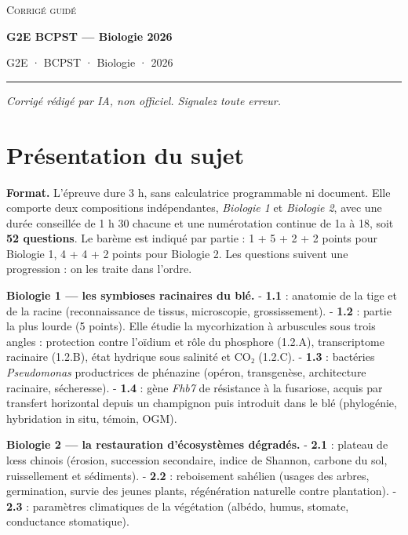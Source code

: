 \documentclass[11pt,a4paper]{article}
\begin{document}
\thispagestyle{plain}
\begin{center}
  {\small\scshape Corrigé guidé}\par\smallskip
  {\LARGE\bfseries G2E BCPST — Biologie 2026\par}\medskip
  {\large G2E · BCPST · Biologie · 2026\par}
\end{center}
\vspace{2pt}\hrule\vspace{8pt}

\emph{Corrigé rédigé par IA, non officiel. Signalez toute erreur.}

\hypertarget{pruxe9sentation-du-sujet}{%
\section{Présentation du sujet}\label{pruxe9sentation-du-sujet}}

\textbf{Format.} L'épreuve dure 3 h, sans calculatrice programmable ni document. Elle comporte deux compositions indépendantes, \emph{Biologie 1} et \emph{Biologie 2}, avec une durée conseillée de 1 h 30 chacune et une numérotation continue de 1a à 18, soit \textbf{52 questions}. Le barème est indiqué par partie : 1 + 5 + 2 + 2 points pour Biologie 1, 4 + 4 + 2 points pour Biologie 2. Les questions suivent une progression : on les traite dans l'ordre.

\textbf{Biologie 1 --- les symbioses racinaires du blé.}
- \textbf{1.1} : anatomie de la tige et de la racine (reconnaissance de tissus, microscopie, grossissement).
- \textbf{1.2} : partie la plus lourde (5 points). Elle étudie la mycorhization à arbuscules sous trois angles : protection contre l'oïdium et rôle du phosphore (1.2.A), transcriptome racinaire (1.2.B), état hydrique sous salinité et CO₂ (1.2.C).
- \textbf{1.3} : bactéries \emph{Pseudomonas} productrices de phénazine (opéron, transgenèse, architecture racinaire, sécheresse).
- \textbf{1.4} : gène \emph{Fhb7} de résistance à la fusariose, acquis par transfert horizontal depuis un champignon puis introduit dans le blé (phylogénie, hybridation in situ, témoin, OGM).

\textbf{Biologie 2 --- la restauration d'écosystèmes dégradés.}
- \textbf{2.1} : plateau de lœss chinois (érosion, succession secondaire, indice de Shannon, carbone du sol, ruissellement et sédiments).
- \textbf{2.2} : reboisement sahélien (usages des arbres, germination, survie des jeunes plants, régénération naturelle contre plantation).
- \textbf{2.3} : paramètres climatiques de la végétation (albédo, humus, stomate, conductance stomatique).
\end{document}
